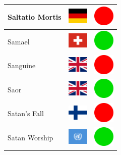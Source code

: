\documentclass[12pt, a4paper, twoside]{report}
\begin{document}
\begin{center}
\begin{longtable}{|p{5cm}|p{2cm}|p{2cm}|}
 Saltatio Mortis                                            & \includegraphics[width=1cm]{../4x3/de} &   \includegraphics[width=1cm]{../likes/n} \\ \hline
 Samael                                                     & \includegraphics[width=1cm]{../4x3/ch} &   \includegraphics[width=1cm]{../likes/y} \\ \hline
 Sanguine                                                   & \includegraphics[width=1cm]{../4x3/gb} &   \includegraphics[width=1cm]{../likes/n} \\ \hline
 Saor                                                       & \includegraphics[width=1cm]{../4x3/gb} &   \includegraphics[width=1cm]{../likes/y} \\ \hline
 Satan's Fall                                               & \includegraphics[width=1cm]{../4x3/fi} &   \includegraphics[width=1cm]{../likes/n} \\ \hline
 Satan Worship                                              & \includegraphics[width=1cm]{../4x3/un} &   \includegraphics[width=1cm]{../likes/y} \\ \hline

\end{longtable}
\end{center}
\end{document}
